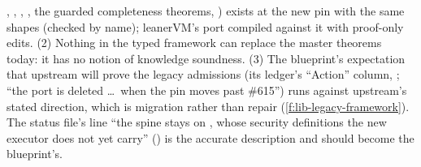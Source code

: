 , , ,
, the guarded completeness theorems,
\allowbreak{}\allowbreak{}) exists at the new pin with the same shapes (checked by name);
leanerVM's port compiled against it with proof-only edits. (2) Nothing in the typed framework can
replace the master theorems today: it has no notion of knowledge soundness. (3) The blueprint's
expectation that upstream will prove the legacy admissions (its ledger's \enquote{Action} column,
\allowbreak{}\allowbreak{}; \enquote{the port is deleted \dots\ when the pin
moves past \#615}) runs against upstream's stated direction, which is migration rather than repair
(\cref{f:lib-legacy-framework}). The status file's line \enquote{the spine stays on
, whose security definitions the new executor does not yet carry}
() is the accurate description and should become the blueprint's.

